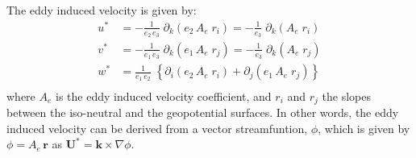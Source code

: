 \documentclass[../tex_main/NEMO_manual]{subfiles}
\begin{document}
The eddy induced velocity is given by: 
\begin{equation} \label{eq:eiv_v}
\begin{split}
 u^* & = - \frac{1}{e_2\,e_{3}}          \;\partial_k \left( e_2 \, A_e \; r_i  \right)   
          = - \frac{1}{e_3}                     \;\partial_k \left(           A_e \; r_i  \right)            \\
 v^* & = - \frac{1}{e_1\,e_3}\;             \partial_k \left( e_1 \, A_e \; r_j  \right)   
          = - \frac{1}{e_3}                     \;\partial_k \left(           A_e \; r_j  \right)             \\
w^* & =    \frac{1}{e_1\,e_2}\; \left\{   \partial_i  \left( e_2 \, A_e \; r_i  \right) 
					              + \partial_j  \left( e_1 \, A_e \;r_j   \right) \right\}   \\
\end{split}
\end{equation}
where $A_{e}$ is the eddy induced velocity coefficient,
and $r_i$ and $r_j$ the slopes between the iso-neutral and the geopotential surfaces.
In other words, the eddy induced velocity can be derived from a vector streamfuntion, $\phi$,
which is given by $\phi = A_e\,\textbf{r}$ as $\textbf{U}^*  = \textbf{k} \times \nabla \phi$.
\end{document}
